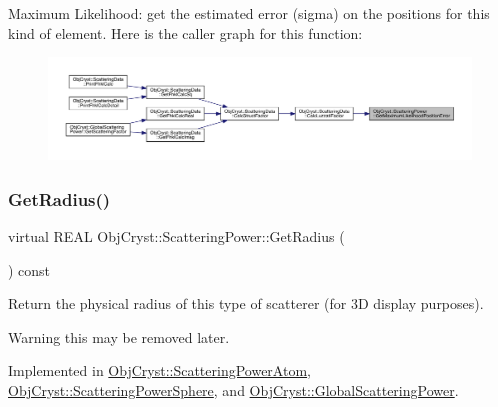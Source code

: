 Maximum Likelihood\+: get the estimated error (sigma) on the positions for this kind of element. Here is the caller graph for this function\+:
\nopagebreak
\begin{figure}[H]
\begin{center}
\leavevmode
\includegraphics[width=350pt]{class_obj_cryst_1_1_scattering_power_ae5d793cc7bb07b5aae0a8dc3c322ba6d_icgraph}
\end{center}
\end{figure}
\mbox{\label{class_obj_cryst_1_1_scattering_power_ac44860aca21734844379ddec87622f7b}} 
\subsubsection{\texorpdfstring{GetRadius()}{GetRadius()}}
{\footnotesize\ttfamily virtual R\+E\+AL Obj\+Cryst\+::\+Scattering\+Power\+::\+Get\+Radius (\begin{DoxyParamCaption}{ }\end{DoxyParamCaption}) const\hspace{0.3cm}{\ttfamily [pure virtual]}}

Return the physical radius of this type of scatterer (for 3D display purposes). \begin{DoxyWarning}{Warning}
this may be removed later. 
\end{DoxyWarning}


Implemented in \mbox{\hyperlink{class_obj_cryst_1_1_scattering_power_atom_aa69db51f5b3cf24a42306bc1b4f45d4c}{Obj\+Cryst\+::\+Scattering\+Power\+Atom}}, \mbox{\hyperlink{class_obj_cryst_1_1_scattering_power_sphere_a0e4cb0c9f333c38f9b6436c54d52a580}{Obj\+Cryst\+::\+Scattering\+Power\+Sphere}}, and \mbox{\hyperlink{class_obj_cryst_1_1_global_scattering_power_af70a0e97e094efd9b45e75122b43d2ea}{Obj\+Cryst\+::\+Global\+Scattering\+Power}}.

